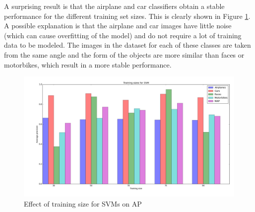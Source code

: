 A surprising result is that the airplane and car classifiers obtain a stable performance for the different training set sizes. This is clearly shown in Figure \ref{fig:svm}. A possible explanation is that the airplane and car images have little noise (which can cause overfitting of the model) and do not require a lot of training data to be modeled. The images in the dataset for each of these classes are taken from the same angle and the form of the objects are more similar than faces or motorbikes, which result in a more stable performance.

\begin{figure}[H]
\includegraphics[width=\textwidth]{../plots/training_size_SVM}
\caption{Effect of training size for SVMs on AP}
\label{fig:svm}
\end{figure}
